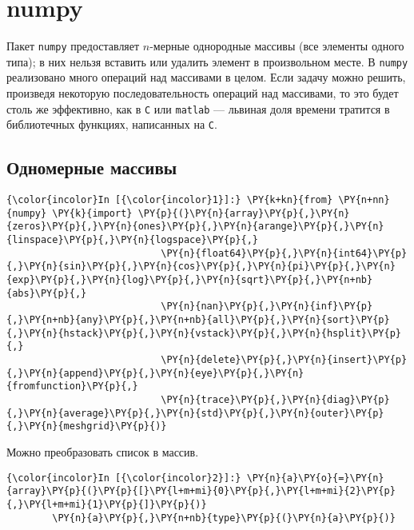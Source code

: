 \section{numpy}
\label{numpy}

Пакет \texttt{numpy} предоставляет \(n\)-мерные однородные массивы (все
элементы одного типа); в них нельзя вставить или удалить элемент в
произвольном месте. В \texttt{numpy} реализовано много операций над
массивами в целом. Если задачу можно решить, произведя некоторую
последовательность операций над массивами, то это будет столь же
эффективно, как в \texttt{C} или \texttt{matlab} --- львиная доля времени
тратится в библиотечных функциях, написанных на \texttt{C}.

\subsection{Одномерные массивы}
\label{numpy1}

    \begin{Verbatim}[commandchars=\\\{\}]
{\color{incolor}In [{\color{incolor}1}]:} \PY{k+kn}{from} \PY{n+nn}{numpy} \PY{k}{import} \PY{p}{(}\PY{n}{array}\PY{p}{,}\PY{n}{zeros}\PY{p}{,}\PY{n}{ones}\PY{p}{,}\PY{n}{arange}\PY{p}{,}\PY{n}{linspace}\PY{p}{,}\PY{n}{logspace}\PY{p}{,}
                           \PY{n}{float64}\PY{p}{,}\PY{n}{int64}\PY{p}{,}\PY{n}{sin}\PY{p}{,}\PY{n}{cos}\PY{p}{,}\PY{n}{pi}\PY{p}{,}\PY{n}{exp}\PY{p}{,}\PY{n}{log}\PY{p}{,}\PY{n}{sqrt}\PY{p}{,}\PY{n+nb}{abs}\PY{p}{,}
                           \PY{n}{nan}\PY{p}{,}\PY{n}{inf}\PY{p}{,}\PY{n+nb}{any}\PY{p}{,}\PY{n+nb}{all}\PY{p}{,}\PY{n}{sort}\PY{p}{,}\PY{n}{hstack}\PY{p}{,}\PY{n}{vstack}\PY{p}{,}\PY{n}{hsplit}\PY{p}{,}
                           \PY{n}{delete}\PY{p}{,}\PY{n}{insert}\PY{p}{,}\PY{n}{append}\PY{p}{,}\PY{n}{eye}\PY{p}{,}\PY{n}{fromfunction}\PY{p}{,}
                           \PY{n}{trace}\PY{p}{,}\PY{n}{diag}\PY{p}{,}\PY{n}{average}\PY{p}{,}\PY{n}{std}\PY{p}{,}\PY{n}{outer}\PY{p}{,}\PY{n}{meshgrid}\PY{p}{)}
\end{Verbatim}

    Можно преобразовать список в массив.

    \begin{Verbatim}[commandchars=\\\{\}]
{\color{incolor}In [{\color{incolor}2}]:} \PY{n}{a}\PY{o}{=}\PY{n}{array}\PY{p}{(}\PY{p}{[}\PY{l+m+mi}{0}\PY{p}{,}\PY{l+m+mi}{2}\PY{p}{,}\PY{l+m+mi}{1}\PY{p}{]}\PY{p}{)}
        \PY{n}{a}\PY{p}{,}\PY{n+nb}{type}\PY{p}{(}\PY{n}{a}\PY{p}{)}
\end{Verbatim}

